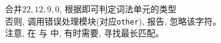 \begin{frame}{}
  \begin{columns}
      \begin{center}
      \end{center}
      \begin{center}
      \end{center}
  \end{columns}

  \pause
  \vspace{0.30cm}
  \begin{center}
     合并$22, 12, 9, 0$, 根据即可判定词法单元的类型 \\[4pt]
    否则, 调用错误处理模块(对应\texttt{other}), 报告, 忽略该字符。 \\[4pt]
    注意, 在 \floatnum{} 与 \scinum{} 中, 有时需要, 寻找最长匹配。
  \end{center}
\end{frame}
